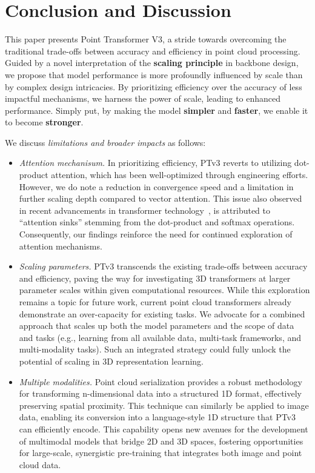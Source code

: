 \section{Conclusion and Discussion}
\label{sec:conclusion}

This paper presents Point Transformer V3, a stride towards overcoming the traditional trade-offs between accuracy and efficiency in point cloud processing. Guided by a novel interpretation of the \textbf{scaling principle} in backbone design, we propose that model performance is more profoundly influenced by scale than by complex design intricacies. By prioritizing efficiency over the accuracy of less impactful mechanisms, we harness the power of scale, leading to enhanced performance. Simply put, by making the model \textbf{simpler} and \textbf{faster}, we enable it to become \textbf{stronger}.

We discuss \textit{limitations and broader impacts} as follows:
\begin{itemize}[leftmargin=4mm, itemsep=0mm, topsep=0mm, partopsep=0mm]
    \item \textit{Attention mechanisum.} In prioritizing efficiency, PTv3 reverts to utilizing dot-product attention, which has been well-optimized through engineering efforts. However, we do note a reduction in convergence speed and a limitation in further scaling depth compared to vector attention. This issue also observed in recent advancements in transformer technology~\cite{xiao2023streamingllm}, is attributed to ``attention sinks'' stemming from the dot-product and softmax operations. Consequently, our findings reinforce the need for continued exploration of attention mechanisms.
    \item \textit{Scaling parameters.} PTv3 transcends the existing trade-offs between accuracy and efficiency, paving the way for investigating 3D transformers at larger parameter scales within given computational resources. While this exploration remains a topic for future work, current point cloud transformers already demonstrate an over-capacity for existing tasks. We advocate for a combined approach that scales up both the model parameters and the scope of data and tasks (e.g., learning from all available data, multi-task frameworks, and multi-modality tasks). Such an integrated strategy could fully unlock the potential of scaling in 3D representation learning.
    \item \textit{Multiple modalities.} Point cloud serialization provides a robust methodology for transforming n-dimensional data into a structured 1D format, effectively preserving spatial proximity. This technique can similarly be applied to image data, enabling its conversion into a language-style 1D structure that PTv3 can efficiently encode. This capability opens new avenues for the development of multimodal models that bridge 2D and 3D spaces, fostering opportunities for large-scale, synergistic pre-training that integrates both image and point cloud data.
\end{itemize}
